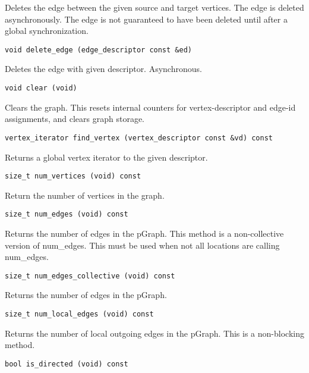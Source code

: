 Deletes the edge between the given source and target vertices. The edge is deleted asynchronously. The edge is not guaranteed to have been deleted until after a global synchronization.

\begin{verbatim}
void delete_edge (edge_descriptor const &ed)
\end{verbatim}

Deletes the edge with given descriptor. Asynchronous.

\begin{verbatim}
void clear (void)
\end{verbatim}

Clears the graph. This resets internal counters for vertex-descriptor and edge-id assignments, and clears graph storage.

\begin{verbatim}
vertex_iterator find_vertex (vertex_descriptor const &vd) const
\end{verbatim}

Returns a global vertex iterator to the given descriptor.

\begin{verbatim}
size_t num_vertices (void) const
\end{verbatim}

Return the number of vertices in the graph.

\begin{verbatim}
size_t num_edges (void) const
\end{verbatim}

Returns the number of edges in the pGraph. This method is a non-collective version of num\_edges. This must be used when not all locations are calling num\_edges.

\begin{verbatim}
size_t num_edges_collective (void) const
\end{verbatim}

Returns the number of edges in the pGraph.

\begin{verbatim}
size_t num_local_edges (void) const
\end{verbatim}

Returns the number of local outgoing edges in the pGraph. This is a non-blocking method.

\begin{verbatim}
bool is_directed (void) const
\end{verbatim}

